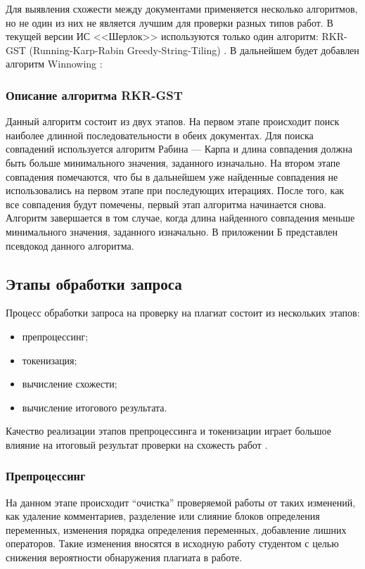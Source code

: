 		Для выявления схожести между документами применяется несколько алгоритмов, но не один из них не является лучшим для проверки разных типов работ. В текущей версии ИС <<Шерлок>> используются только один алгоритм: RKR-GST (Running-Karp-Rabin Greedy-String-Tiling) \cite{Wise1993}. В дальнейшем будет добавлен алгоритм Winnowing \cite{Winnowing2003}:

		\subsubsection{Описание алгоритма RKR-GST}

			Данный алгоритм состоит из двух этапов. На первом этапе происходит поиск наиболее длинной последовательности в обеих документах. Для поиска совпадений используется алгоритм Рабина — Карпа \cite{Karp1987} и длина совпадения должна быть больше минимального значения, заданного изначально. На втором этапе совпадения помечаются, что бы в дальнейшем уже найденные совпадения не использовались на первом этапе при последующих итерациях. После того, как все совпадения будут помечены, первый этап алгоритма начинается снова. Алгоритм завершается в том случае, когда длина найденного совпадения меньше минимального значения, заданного изначально. В приложении Б представлен псевдокод данного алгоритма.

	\newpage
	\subsection{Этапы обработки запроса}

		Процесс обработки запроса на проверку на плагиат состоит из нескольких этапов:
		\begin{itemize}			
			\item препроцессинг;
			\item токенизация;
			\item вычисление схожести;
			\item вычисление итогового результата.
		\end{itemize}

		Качество реализации этапов препроцессинга и токенизации играет большое влияние на итоговый результат проверки на схожесть работ \cite{Kleiman2009}. 

		\subsubsection{Препроцессинг}

			На данном этапе происходит ``очистка'' проверяемой работы от таких изменений, как удаление комментариев, разделение или слияние блоков определения переменных, изменения порядка определения переменных, добавление лишних операторов. Такие изменения вносятся в исходную работу студентом с целью снижения вероятности обнаружения плагиата в работе.

